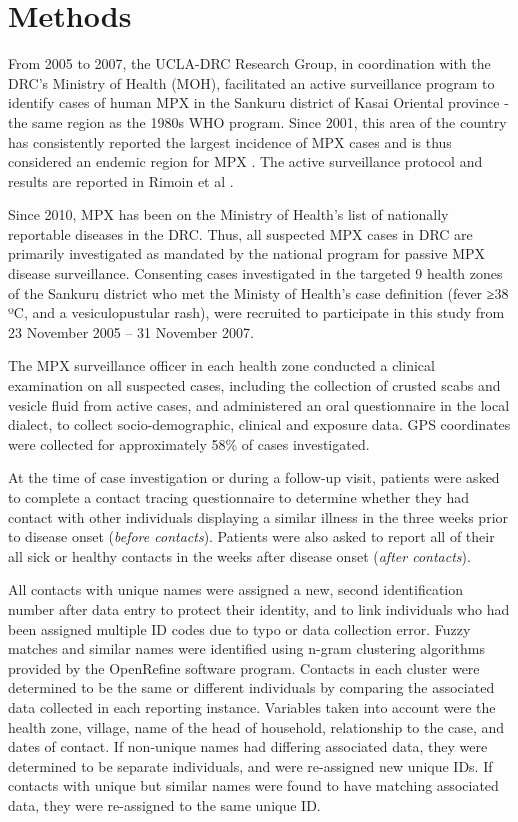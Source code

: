 \section{Methods}

From 2005 to 2007, the UCLA-DRC Research Group, in coordination with the DRC’s Ministry of Health (MOH), facilitated an active surveillance program to identify cases of human MPX in the Sankuru district of Kasai Oriental province - the same region as the 1980s WHO program. Since 2001, this area of the country has consistently reported the largest incidence of MPX cases and is thus considered an endemic region for MPX \cite{Rimoin2010}. The active surveillance protocol and results are reported in Rimoin et al \cite{Rimoin2010}.

Since 2010, MPX has been on the Ministry of Health's list of nationally reportable diseases in the DRC. Thus, all suspected MPX cases in DRC are primarily investigated as mandated by the national program for passive MPX disease surveillance. Consenting cases investigated in the targeted 9 health zones of the Sankuru district who met the  Ministy of Health’s case definition (fever ≥38 ºC, and a vesiculopustular rash), were recruited to participate in this study from 23 November 2005 – 31 November 2007. 

The MPX surveillance officer in each health zone conducted a clinical examination on all suspected cases, including the collection of crusted scabs and vesicle fluid from active cases, and administered an oral questionnaire in the local dialect, to collect socio-demographic, clinical and exposure data. GPS coordinates were collected for approximately 58\% of cases investigated. 


At the time of case investigation or during a follow-up visit, patients were asked to complete a contact tracing questionnaire to determine whether they had contact with other individuals displaying a similar illness in the three weeks prior to disease onset  (\textit{before contacts}). Patients were also asked to report all of their all sick or healthy contacts in the weeks after disease onset (\textit{after contacts}).

All contacts with unique names were assigned a new, second identification number after data entry to protect their identity, and to link individuals who had been assigned multiple ID codes due to typo or data collection error. Fuzzy matches and similar names were identified using n-gram clustering algorithms provided by the OpenRefine software program. Contacts in each cluster were determined to be the same or different individuals by comparing the associated data collected in each reporting instance. Variables taken into account were the health zone, village, name of the head of household, relationship to the case, and dates of contact. If non-unique names had differing associated data, they were determined to be separate individuals, and were re-assigned new unique IDs. If contacts with unique but similar names were found to have matching associated data, they were re-assigned to the same unique ID.

